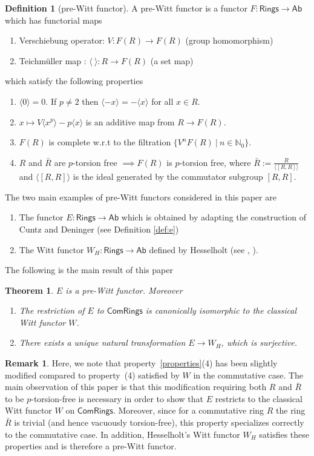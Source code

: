 \documentclass[11pt]{amsart}
\theoremstyle{plain}
\newtheorem{theorem}[thm]{Theorem}
\theoremstyle{definition}
\newtheorem{remark}[thm]{Remark}
\newtheorem{definition}[thm]{Definition}
\newcommand{\N}{{\mathbb N}}
\newcommand{\ab}[1]{\langle {#1} \rangle}
\newcommand{\Rings}{{\mathsf{Rings}}}
\newcommand{\Com}{{\mathsf{ComRings}}}
\newcommand{\Ab}{{\mathsf{Ab}}}
\begin{document}
\begin{definition}[pre-Witt functor]\label{def:prewitt}
    A pre-Witt functor is a functor $F:\Rings \to \Ab$ which has functorial maps 
\begin{enumerate}
    \item Verschiebung operator: $V: F(R)\to F(R)$ (group homomorphism)
    \item Teichm\"{u}ller map : $\ab{\ }: R\to F(R)$ (a set map)
\end{enumerate}
which satisfy the following properties 
\begin{enumerate}\label{properties}
    \item $\ab{0}=0$. If $p\neq 2$ then $\ab{-x} = -\ab{x}$ for all $x \in R$.
    \item $x \mapsto V\ab{x^p} -p\ab{x}$ is an additive map from $R \to F(R)$. 
    \item $F(R)$ is complete w.r.t to the filtration $\{V^nF(R)\ | \ n \in \N_0 \}$.
    \item $R$ and $\bar{R}$ are $p$-torsion free $\implies F(R)$ is $p$-torsion free, where $\bar{R} := \frac{R}{\ab{[R,R]}}$ and  $\ab{[R,R]}$ is the ideal generated by the commutator subgroup $[R,R]$. 
\end{enumerate}
\end{definition}

\noindent The two main examples of pre-Witt functors considered in this paper are
\begin{enumerate}
\item The functor $E : \Rings \to \Ab$ which is obtained by adapting the construction of Cuntz and Deninger (see Definition \ref{def:e})
\item The Witt functor $W_H: \Rings \to \Ab$ defined by Hesselholt (see \cite{h1}, \cite{h2}). 
\end{enumerate}
\vspace{2mm}
The following is the main result of this paper
\begin{theorem} \label{main} 
$E$ is a pre-Witt functor. Moreover 
\begin{enumerate}
\item The restriction of $E$ to $\Com$ is canonically isomorphic to the classical Witt functor $W$.
\item There exists a unique natural transformation $E \to W_H$, which is surjective.
\end{enumerate}
\end{theorem}

\begin{remark}
Here, we note that property~\eqref{properties}(4) has been slightly modified compared to property~(4) satisfied by $W$ in the commutative case. The main observation of this paper is that this modification requiring both $R$ and $\bar{R}$ to be $p$-torsion-free is necessary in order to show that $E$ restricts to the classical Witt functor $W$ on $\Com$. Moreover, since for a commutative ring $R$ the ring $\bar{R}$ is trivial (and hence vacuously torsion-free), this property specializes correctly to the commutative case. In addition, Hesselholt’s Witt functor $W_H$ satisfies these properties and is therefore a pre-Witt functor.
\end{remark}
\end{document}
